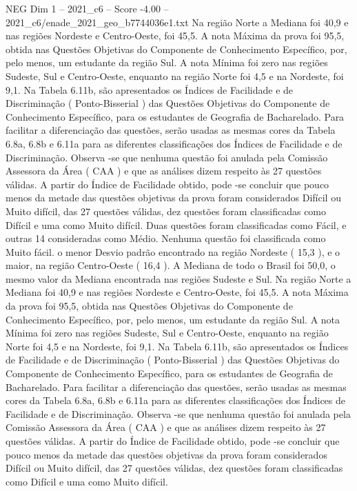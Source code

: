 \begin{textsample}{NEG Dim 1 – 2021\_c6 – Score -4.00 – 2021\_c6/enade\_2021\_geo\_b7744036e1.txt}
Na região Norte a Mediana foi 40,9 e nas regiões Nordeste e Centro-Oeste, foi 45,5.
A nota Máxima da prova foi 95,5, obtida nas Questões Objetivas do Componente de Conhecimento Específico, por, pelo menos, um estudante da região Sul.
A nota Mínima foi zero nas regiões Sudeste, Sul e Centro-Oeste, enquanto na região Norte foi 4,5 e na Nordeste, foi 9,1.
Na Tabela 6.11b, são apresentados os Índices de Facilidade e de Discriminação ( Ponto-Bisserial ) das Questões Objetivas do Componente de Conhecimento Específico, para os estudantes de Geografia de Bacharelado.
Para facilitar a diferenciação das questões, serão usadas as mesmas cores da Tabela 6.8a, 6.8b e 6.11a para as diferentes classificações dos Índices de Facilidade e de Discriminação.
Observa -se que nenhuma questão foi anulada pela Comissão Assessora da Área ( CAA ) e que as análises dizem respeito às 27 questões válidas.
A partir do Índice de Facilidade obtido, pode -se concluir que pouco menos da metade das questões objetivas da prova foram considerados Difícil ou Muito difícil, das 27 questões válidas, dez questões foram classificadas como Difícil e uma como Muito difícil.
Duas questões foram classificadas como Fácil, e outras 14 consideradas como Médio.
Nenhuma questão foi classificada como Muito fácil. o menor Desvio padrão encontrado na região Nordeste ( 15,3 ), e o maior, na região Centro-Oeste ( 16,4 ).
A Mediana de todo o Brasil foi 50,0, o mesmo valor da Mediana encontrada nas regiões Sudeste e Sul.
Na região Norte a Mediana foi 40,9 e nas regiões Nordeste e Centro-Oeste, foi 45,5.
A nota Máxima da prova foi 95,5, obtida nas Questões Objetivas do Componente de Conhecimento Específico, por, pelo menos, um estudante da região Sul.
A nota Mínima foi zero nas regiões Sudeste, Sul e Centro-Oeste, enquanto na região Norte foi 4,5 e na Nordeste, foi 9,1.
Na Tabela 6.11b, são apresentados os Índices de Facilidade e de Discriminação ( Ponto-Bisserial ) das Questões Objetivas do Componente de Conhecimento Específico, para os estudantes de Geografia de Bacharelado.
Para facilitar a diferenciação das questões, serão usadas as mesmas cores da Tabela 6.8a, 6.8b e 6.11a para as diferentes classificações dos Índices de Facilidade e de Discriminação.
Observa -se que nenhuma questão foi anulada pela Comissão Assessora da Área ( CAA ) e que as análises dizem respeito às 27 questões válidas.
A partir do Índice de Facilidade obtido, pode -se concluir que pouco menos da metade das questões objetivas da prova foram considerados Difícil ou Muito difícil, das 27 questões válidas, dez questões foram classificadas como Difícil e uma como Muito difícil.

\end{textsample}
